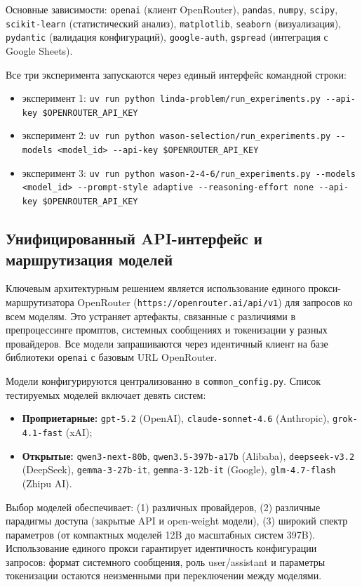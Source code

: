 Основные зависимости: \texttt{openai} (клиент OpenRouter), \texttt{pandas}, \texttt{numpy}, \texttt{scipy}, \texttt{scikit-learn} (статистический анализ), \texttt{matplotlib}, \texttt{seaborn} (визуализация), \texttt{pydantic} (валидация конфигураций), \texttt{google-auth}, \texttt{gspread} (интеграция с Google Sheets).

Все три эксперимента запускаются через единый интерфейс командной строки:
\begin{itemize}
  \item эксперимент 1: \texttt{uv run python linda-problem/run\_experiments.py {-}{-}api-key \$OPENROUTER\_API\_KEY}
  \item эксперимент 2: \texttt{uv run python wason-selection/run\_experiments.py {-}{-}models <model\_id> {-}{-}api-key \$OPENROUTER\_API\_KEY}
  \item эксперимент 3: \texttt{uv run python wason-2-4-6/run\_experiments.py {-}{-}models <model\_id> {-}{-}prompt-style adaptive {-}{-}reasoning-effort none {-}{-}api-key \$OPENROUTER\_API\_KEY}
\end{itemize}

\subsection{Унифицированный API-интерфейс и маршрутизация моделей}

Ключевым архитектурным решением является использование единого прокси-маршрутизатора OpenRouter (\texttt{https://openrouter.ai/api/v1}) для запросов ко всем моделям. Это устраняет артефакты, связанные с различиями в препроцессинге промптов, системных сообщениях и токенизации у разных провайдеров. Все модели запрашиваются через идентичный клиент на базе библиотеки \texttt{openai} с базовым URL OpenRouter.

Модели конфигурируются централизованно в \texttt{common\_config.py}. Список тестируемых моделей включает девять систем:
\begin{itemize}
  \item \textbf{Проприетарные:} \texttt{gpt-5.2} (OpenAI), \texttt{claude-sonnet-4.6} (Anthropic), \texttt{grok-4.1-fast} (xAI);
  \item \textbf{Открытые:} \texttt{qwen3-next-80b}, \texttt{qwen3.5-397b-a17b} (Alibaba), \texttt{deepseek-v3.2} (DeepSeek), \texttt{gemma-3-27b-it}, \texttt{gemma-3-12b-it} (Google), \texttt{glm-4.7-flash} (Zhipu AI).
\end{itemize}

Выбор моделей обеспечивает: (1) различных провайдеров, (2) различные парадигмы доступа (закрытые API и open-weight модели), (3) широкий спектр параметров (от компактных моделей 12B до масштабных систем 397B). Использование единого прокси гарантирует идентичность конфигурации запросов: формат системного сообщения, роль user/assistant и параметры токенизации остаются неизменными при переключении между моделями.

